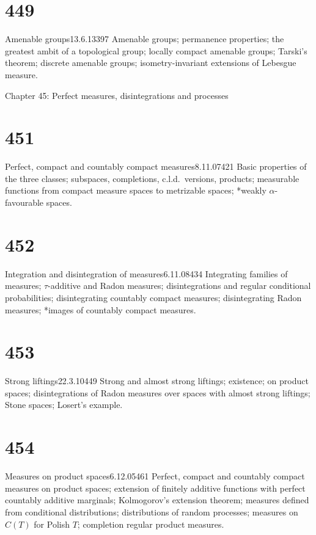 \section{449}{Amenable groups}{13.6.13}{397}{}
{Amenable groups;  permanence properties;  the greatest ambit of a
topological group;  locally compact
amenable groups;  Tarski's theorem;  discrete amenable groups; 
isometry-invariant extensions of Lebesgue measure.}


Chapter 45: Perfect measures, disintegrations and processes


\section{451}{Perfect, compact and countably compact
measures}{8.11.07}{421}{}
{Basic properties of the three classes;  subspaces, completions,
c.l.d.\ versions, products;  measurable functions from compact
measure spaces to metrizable spaces;  *weakly
$\alpha$-favourable spaces.}

\section{452}{Integration and disintegration of
measures}{6.11.08}{434}{}
{Integrating families of measures;  $\tau$-additive and
Radon measures;  disintegrations and regular conditional probabilities;
disintegrating countably compact
measures;  disintegrating Radon measures;  *images of countably compact
measures.}

\section{453}{Strong liftings}{22.3.10}{449}{}
{Strong and almost strong liftings;  existence;  on product spaces;
disintegrations
of Radon measures over spaces with almost strong liftings;  Stone
spaces;  Losert's example.}

\section{454}{Measures on product spaces}{6.12.05}{461}{}
{Perfect, compact and countably compact measures on product
spaces;  extension of finitely additive functions with perfect countably
additive marginals;  Kolmogorov's extension theorem;  measures defined
from conditional distributions;  distributions of random processes;
measures on $C(T)$ for Polish $T$;  completion regular product measures.}

